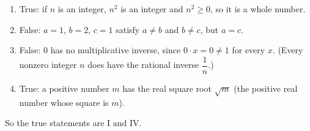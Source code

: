 \begin{enumerate}
\item[I.] True: if $n$ is an integer, $n^2$ is an integer and $n^2\ge0$, so it is a whole number.
\item[II.] False: $a=1$, $b=2$, $c=1$ satisfy $a\ne b$ and $b\ne c$, but $a=c$.
\item[III.] False: $0$ has no multiplicative inverse, since $0\cdot x=0\ne1$ for every $x$. (Every nonzero integer $n$ does have the rational inverse $\dfrac{1}{n}$.)
\item[IV.] True: a positive number $m$ has the real square root $\sqrt m$ (the positive real number whose square is $m$).
\end{enumerate}
So the true statements are $\boxed{\text{I and IV}}$.
